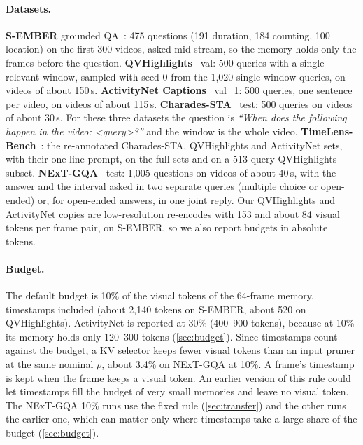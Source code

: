\paragraph{Datasets.}
\textbf{S-EMBER} grounded QA~\cite{sember}: 475 questions (191 duration, 184 counting, 100 location) on the first
300 videos, asked mid-stream, so the memory holds only the frames before the question.
\textbf{QVHighlights}~\cite{qvhighlights} val: 500 queries with a single relevant window, sampled with seed 0 from
the 1{,}020 single-window queries, on videos of about 150\,s.
\textbf{ActivityNet Captions}~\cite{activitynet} val\_1: 500 queries, one sentence per video, on videos of about
115\,s. \textbf{Charades-STA}~\cite{charadessta} test: 500 queries on videos of about 30\,s. For these three datasets
the question is \emph{``When does the following happen in the video: \textless query\textgreater?''} and the window is
the whole video.
\textbf{TimeLens-Bench}~\cite{timelens}: the re-annotated Charades-STA, QVHighlights and ActivityNet sets, with their
one-line prompt, on the full sets and on a 513-query QVHighlights subset. \textbf{NExT-GQA}~\cite{nextgqa} test:
1{,}005 questions on videos of about 40\,s, with the answer and the interval asked in two separate queries (multiple
choice or open-ended) or, for open-ended answers, in one joint reply. Our QVHighlights and ActivityNet copies are
low-resolution re-encodes with 153 and about 84 visual tokens per frame pair,  on S-EMBER, so we also report
budgets in absolute tokens.

\paragraph{Budget.}
The default budget is 10\% of the visual tokens of the 64-frame memory, timestamps included (about 2{,}140 tokens on
S-EMBER, about 520 on QVHighlights). ActivityNet is reported at 30\% (400--900 tokens), because at 10\% its memory
holds only 120--300 tokens (\cref{sec:budget}). Since timestamps count against the budget, a KV selector keeps fewer
visual tokens than an input pruner at the same nominal $\rho$, about 3.4\% on NExT-GQA at 10\%. A frame's timestamp
is kept when the frame keeps a visual token. An earlier version of this rule could let timestamps fill the budget of
very small memories and leave no visual token. The NExT-GQA 10\% runs use the fixed rule (\cref{sec:transfer}) and
the other runs the earlier one, which can matter only where timestamps take a large share of the budget
(\cref{sec:budget}).

